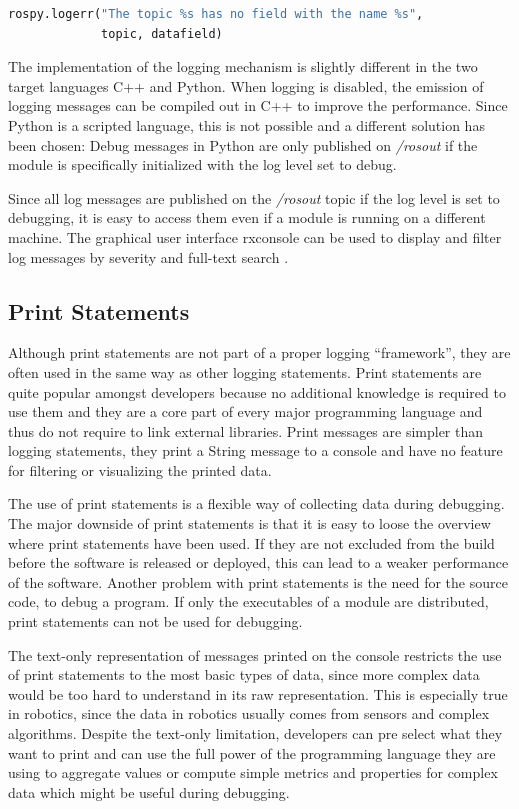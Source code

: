 \begin{lstlisting}[frame=single,caption={ROS logging example in Python.},label=python_logging,language=Python]
rospy.logerr("The topic %s has no field with the name %s",
             topic, datafield)
\end{lstlisting}

The implementation of the logging mechanism is slightly different in the two target languages C++ and Python. When logging is disabled, the emission of logging messages can be compiled out in C++ to improve the performance. Since Python is a scripted language, this is not possible and a different solution has been chosen: Debug messages in Python are only published on \emph{/rosout} if the module is specifically initialized with the log level set to debug.

Since all log messages are published on the \emph{/rosout} topic if the log level is set to debugging, it is easy to access them even if a module is running on a different machine. The graphical user interface rxconsole can be used to display and filter log messages by severity and full-text search \cite{rxconsole}.

\subsection{Print Statements}
Although print statements are not part of a proper logging ``framework'', they are often used in the same way as other logging statements. Print statements are quite popular amongst developers because no additional knowledge is required to use them and they are a core part of every major programming language and thus do not require to link external libraries. Print messages are simpler than logging statements, they print a String message to a console and have no feature for filtering or visualizing the printed data.

The use of print statements is a flexible way of collecting data during debugging. The major downside of print statements is that it is easy to loose the overview where print statements have been used. If they are not excluded from the build before the software is released or deployed, this can lead to a weaker performance of the software. Another problem with print statements is the need for the source code, to debug a program. If only the executables of a module are distributed, print statements can not be used for debugging.

The text-only representation of messages printed on the console restricts the use of print statements to the most basic types of data, since more complex data would be too hard to understand in its raw representation. This is especially true in robotics, since the data in robotics usually comes from sensors and complex algorithms. Despite the text-only limitation, developers can pre select what they want to print and can use the full power of the programming language they are using to aggregate values or compute simple metrics and properties for complex data which might be useful during debugging.

